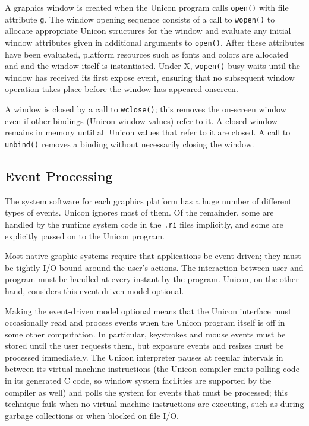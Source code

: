 A graphics window is created when the Unicon program calls
\texttt{open()} with file attribute
\texttt{{\textquotedbl}g{\textquotedbl}}. The window opening sequence
consists of a call to \texttt{wopen()} to allocate appropriate Unicon
structures for the window and evaluate any initial window attributes
given in additional arguments to \texttt{open()}. After these
attributes have been evaluated, platform resources such as fonts and
colors are allocated and and the window itself is instantiated. Under
X, \texttt{wopen()} busy-waits until the window has received its first
expose event, ensuring that no subsequent window operation takes place
before the window has appeared onscreen.

A window is closed by a call to \texttt{wclose()}; this removes the
on-screen window even if other bindings (Unicon window values) refer
to it. A closed window remains in memory until all Unicon values that
refer to it are closed. A call to \texttt{unbind()} removes a binding
without necessarily closing the window.

\subsection{Event Processing}

The system software for each graphics platform has a huge number of
different types of events. Unicon ignores most of them. Of the
remainder, some are handled by the runtime system code in the
\texttt{.ri} files implicitly, and some are explicitly passed on to
the Unicon program.

Most native graphic systems require that applications be event-driven;
they must be tightly I/O bound around the user's actions. The
interaction between user and program must be handled at every instant
by the program. Unicon, on the other hand, considers this event-driven
model optional.


Making the event-driven model optional means that the Unicon interface
must occasionally read and process events when the Unicon program
itself is off in some other computation. In particular, keystrokes and
mouse events must be stored until the user requests them, but exposure
events and resizes must be processed immediately. The Unicon
interpreter pauses at regular intervals in between its virtual machine
instructions (the Unicon compiler emits polling code in its generated
C code, so window system facilities are supported by the compiler as
well) and polls the system for events that must be processed; this
technique fails when no virtual machine instructions are executing,
such as during garbage collections or when blocked on file I/O.

